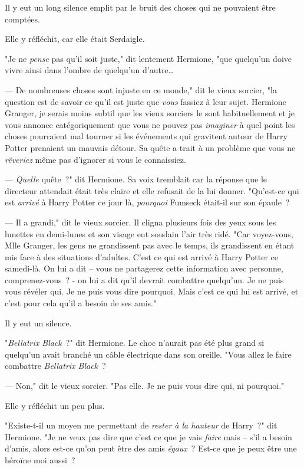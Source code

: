 Il y eut un long silence emplit par le bruit des choses qui ne pouvaient être comptées.

Elle y réfléchit, car elle était Serdaigle.

"Je ne \emph{pense} pas qu'il soit juste," dit lentement Hermione, "que quelqu'un doive vivre ainsi dans l'ombre de quelqu'un d'autre…

--- De nombreuses choses sont injuste en ce monde," dit le vieux sorcier, "la question est de savoir ce qu'il est juste que \emph{vous} fassiez à leur sujet. Hermione Granger, je serais moins subtil que les vieux sorciers le sont habituellement et je vous annonce catégoriquement que vous ne pouvez pas \emph{imaginer} à quel point les choses pourraient mal tourner si les événements qui gravitent autour de Harry Potter prenaient un mauvais détour. Sa quête a trait à un problème que vous ne \emph{rêveriez} même pas d'ignorer si vous le connaissiez.

--- \emph{Quelle} quête~?" dit Hermione. Sa voix tremblait car la réponse que le directeur attendait était très claire et elle refusait de la lui donner. "Qu'est-ce qui est \emph{arrivé} à Harry Potter ce jour là, \emph{pourquoi} Fumseck était-il sur son épaule~?

--- Il a grandi," dit le vieux sorcier. Il cligna plusieurs fois des yeux sous les lunettes en demi-lunes et son visage eut soudain l'air très ridé. "Car voyez-vous, Mlle Granger, les gens ne grandissent pas avec le temps, ils grandissent en étant mis face à des situations d'adultes. C'est ce qui est arrivé à Harry Potter ce samedi-là. On lui a dit -- vous ne partagerez cette information avec personne, comprenez-vous~? - on lui a dit qu'il devrait combattre quelqu'un. Je ne puis vous révéler qui. Je ne puis vous dire pourquoi. Mais c'est ce qui lui est arrivé, et c'est pour cela qu'il a besoin de ses amis."

Il y eut un silence.

"\emph{Bellatrix Black}~?" dit Hermione. Le choc n'aurait pas été plus grand si quelqu'un avait branché un câble électrique dans son oreille. "Vous allez le faire combattre \emph{Bellatrix Black}~?

--- Non," dit le vieux sorcier. "Pas elle. Je ne puis vous dire qui, ni pourquoi."

Elle y réfléchit un peu plus.

"Existe-t-il un moyen me permettant de \emph{rester à la hauteur} de Harry~?" dit Hermione. "Je ne veux pas dire que c'est ce que je vais \emph{faire} mais -- s'il a besoin d'amis, alors est-ce qu'on peut être des amis \emph{égaux}~? Est-ce que je peux être une héroïne moi aussi~?


